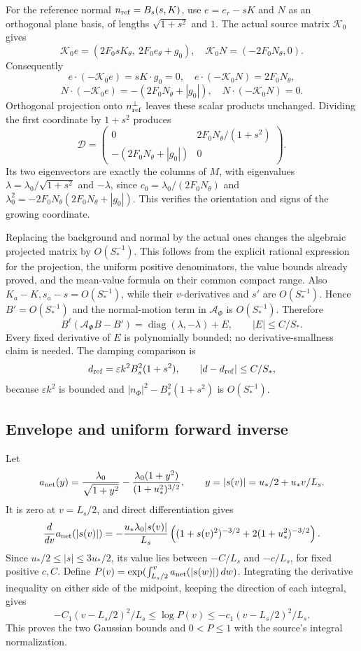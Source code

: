 \documentclass[10pt,a4paper]{article}
\begin{document}
For the reference normal \(n_{\rm ref}=B_s(s,K)\), use \(e=e_r-sK\) and \(N\) as an orthogonal plane basis, of lengths \(\sqrt{1+s^2}\) and \(1\). The actual source matrix \(\mathcal K_0\) gives \[
\mathcal K_0e=(2F_0sK_\theta,\ 2F_0e_\theta+g_0),\quad
\mathcal K_0N=(-2F_0N_\theta,0).
\] Consequently \[
e\cdot(-\mathcal K_0e)=sK\cdot g_0=0,\quad
e\cdot(-\mathcal K_0N)=2F_0N_\theta,
\] \[
N\cdot(-\mathcal K_0e)=-(2F_0N_\theta+|g_0|),\quad
N\cdot(-\mathcal K_0N)=0.
\] Orthogonal projection onto \(n_{\rm ref}^\perp\) leaves these scalar products unchanged. Dividing the first coordinate by \(1+s^2\) produces \[
\mathcal D=
\begin{pmatrix}
0&2F_0N_\theta/(1+s^2)\\
-(2F_0N_\theta+|g_0|)&0
\end{pmatrix}.
\] Its two eigenvectors are exactly the columns of \(M\), with eigenvalues \(\lambda=\lambda_0/\sqrt{1+s^2}\) and \(-\lambda\), since \(c_0=\lambda_0/(2F_0N_\theta)\) and \(\lambda_0^2=-2F_0N_\theta(2F_0N_\theta+|g_0|)\). This verifies the orientation and signs of the growing coordinate.

Replacing the background and normal by the actual ones changes the algebraic projected matrix by \(O(S_*^{-1})\). This follows from the explicit rational expression for the projection, the uniform positive denominators, the value bounds already proved, and the mean-value formula on their common compact range. Also \(K_a-K,s_a-s=O(S_*^{-1})\), while their \(v\)-derivatives and \(s'\) are \(O(S_*^{-1})\). Hence \(B'=O(S_*^{-1})\) and the normal-motion term in \(\mathcal A_\Phi\) is \(O(S_*^{-1})\). Therefore \[
B^\ell(\mathcal A_\Phi B-B')=
\operatorname{diag}(\lambda,-\lambda)+E,\qquad |E|\le C/S_*.
\] Every fixed derivative of \(E\) is polynomially bounded; no derivative-smallness claim is needed. The damping comparison is \[
d_{\rm ref}=\varepsilon k^2B_s^2(1+s^2),\qquad
|d-d_{\rm ref}|\le C/S_*,
\] because \(\varepsilon k^2\) is bounded and \(|n_\Phi|^2-B_s^2(1+s^2)\) is \(O(S_*^{-1})\).

\subsection{Envelope and uniform forward inverse}\label{envelope-and-uniform-forward-inverse}

Let \[
a_{\rm net}(y)=\frac{\lambda_0}{\sqrt{1+y^2}}-
\frac{\lambda_0(1+y^2)}{(1+u_*^2)^{3/2}},
\qquad y=|s(v)|=u_*/2+u_*v/L_s.
\] It is zero at \(v=L_s/2\), and direct differentiation gives \[
\frac{d}{dv}a_{\rm net}(|s(v)|)
=-\frac{u_*\lambda_0|s(v)|}{L_s}
\left((1+s(v)^2)^{-3/2}+2(1+u_*^2)^{-3/2}\right).
\] Since \(u_*/2\le|s|\le3u_*/2\), its value lies between \(-C/L_s\) and \(-c/L_s\), for fixed positive \(c,C\). Define \(P(v)=\exp(\int_{L_s/2}^v a_{\rm net}(|s(w)|)\,dw)\). Integrating the derivative inequality on either side of the midpoint, keeping the direction of each integral, gives \[
-C_1(v-L_s/2)^2/L_s\le\log P(v)\le-c_1(v-L_s/2)^2/L_s.
\] This proves the two Gaussian bounds and \(0<P\le1\) with the source's integral normalization.
\end{document}
